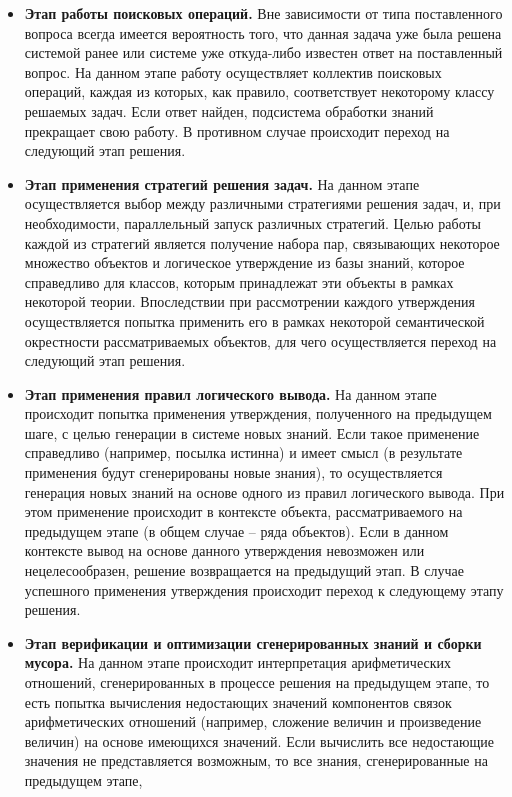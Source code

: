 \begin{itemize}
	\item{\textbf{Этап работы поисковых операций.} Вне зависимости от типа поставленного вопроса всегда имеется вероятность того, что данная задача уже была решена системой ранее или системе уже 	откуда-либо известен ответ на поставленный вопрос. На данном этапе работу осуществляет коллектив поисковых операций, каждая из которых, как правило, соответствует некоторому классу	решаемых задач. Если ответ найден, подсистема обработки знаний прекращает свою работу. В противном случае происходит переход на следующий этап решения.}
	\item{\textbf{Этап применения стратегий решения задач.}	На данном этапе осуществляется выбор между
	различными стратегиями решения задач, и, при необходимости, параллельный запуск различных стратегий. Целью работы каждой из стратегий является получение набора пар, связывающих некоторое множество объектов и логическое утверждение из базы знаний, которое справедливо для классов, которым принадлежат эти объекты в рамках некоторой теории. Впоследствии при	рассмотрении каждого утверждения осуществляется	попытка применить его в рамках некоторой семантической окрестности рассматриваемых объектов, для чего осуществляется переход на следующий этап решения.}
	\item{\textbf{Этап применения правил логического вывода.} На данном этапе происходит попытка применения утверждения, полученного на предыдущем шаге, с целью генерации в системе	новых знаний. Если такое применение справедливо (например, посылка истинна) и имеет смысл (в результате применения будут сгенерированы новые знания), то осуществляется генерация новых знаний на основе одного из правил логического вывода. При этом применение происходит в контексте объекта, рассматриваемого на предыдущем этапе (в общем случае – ряда объектов). Если в данном контексте вывод на основе данного утверждения	невозможен или нецелесообразен, решение возвращается на предыдущий этап. В случае успешного применения утверждения происходит переход к следующему этапу решения.}
	\item{\textbf{Этап верификации и оптимизации сгенерированных знаний и сборки мусора.} На данном этапе происходит интерпретация арифметических отношений, сгенерированных в процессе решения на предыдущем этапе, то есть попытка вычисления недостающих значений компонентов связок арифметических отношений
	(например, сложение величин и произведение величин) на основе имеющихся значений. Если вычислить все недостающие значения не представляется возможным, то все знания, сгенерированные на предыдущем этапе,
}
\end{itemize}
